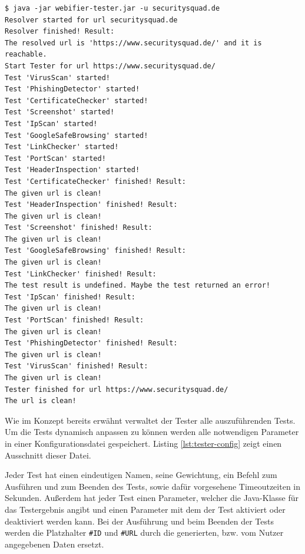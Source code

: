 \begin{scriptsize}
\begin{lstlisting}
$ java -jar webifier-tester.jar -u securitysquad.de
Resolver started for url securitysquad.de
Resolver finished! Result:
The resolved url is 'https://www.securitysquad.de/' and it is reachable.
Start Tester for url https://www.securitysquad.de/
Test 'VirusScan' started!
Test 'PhishingDetector' started!
Test 'CertificateChecker' started!
Test 'Screenshot' started!
Test 'IpScan' started!
Test 'GoogleSafeBrowsing' started!
Test 'LinkChecker' started!
Test 'PortScan' started!
Test 'HeaderInspection' started!
Test 'CertificateChecker' finished! Result:
The given url is clean!
Test 'HeaderInspection' finished! Result:
The given url is clean!
Test 'Screenshot' finished! Result:
The given url is clean!
Test 'GoogleSafeBrowsing' finished! Result:
The given url is clean!
Test 'LinkChecker' finished! Result:
The test result is undefined. Maybe the test returned an error!
Test 'IpScan' finished! Result:
The given url is clean!
Test 'PortScan' finished! Result:
The given url is clean!
Test 'PhishingDetector' finished! Result:
The given url is clean!
Test 'VirusScan' finished! Result:
The given url is clean!
Tester finished for url https://www.securitysquad.de/
The url is clean!
\end{lstlisting}
\end{scriptsize}

Wie im Konzept bereits erwähnt verwaltet der Tester alle auszuführenden Tests. Um die Tests dynamisch anpassen zu können werden alle notwendigen Parameter in einer Konfigurationsdatei gespeichert. Listing \ref{lst:tester-config} zeigt einen Ausschnitt dieser Datei.

Jeder Test hat einen eindeutigen Namen, seine Gewichtung, ein Befehl zum Ausführen und zum Beenden des Tests, sowie dafür vorgesehene Timeoutzeiten in Sekunden. Außerdem hat jeder Test einen Parameter, welcher die Java-Klasse für das Testergebnis angibt und einen Parameter mit dem der Test aktiviert oder deaktiviert werden kann. Bei der Ausführung und beim Beenden der Tests werden die Platzhalter \lstinline[style=eclipse]{#ID} und \lstinline[style=eclipse]{#URL} durch die generierten, bzw. vom Nutzer angegebenen Daten ersetzt.

